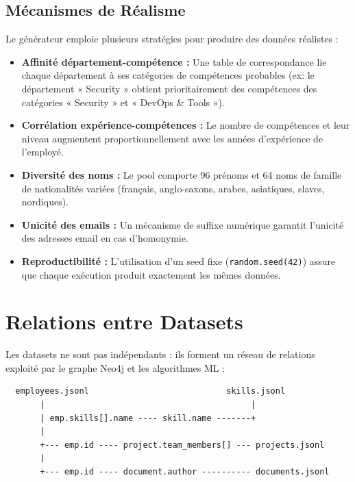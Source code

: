 \documentclass[12pt,a4paper]{article}
\begin{document}
\subsection{Mécanismes de Réalisme}

Le générateur emploie plusieurs stratégies pour produire des données réalistes :

\begin{itemize}[leftmargin=*]
    \item \textbf{Affinité département-compétence :} Une table de correspondance lie chaque département à ses catégories de compétences probables (ex: le département « Security » obtient prioritairement des compétences des catégories « Security » et « DevOps \& Tools »).
    \item \textbf{Corrélation expérience-compétences :} Le nombre de compétences et leur niveau augmentent proportionnellement avec les années d'expérience de l'employé.
    \item \textbf{Diversité des noms :} Le pool comporte 96 prénoms et 64 noms de famille de nationalités variées (français, anglo-saxons, arabes, asiatiques, slaves, nordiques).
    \item \textbf{Unicité des emails :} Un mécanisme de suffixe numérique garantit l'unicité des adresses email en cas d'homonymie.
    \item \textbf{Reproductibilité :} L'utilisation d'un seed fixe (\texttt{random.seed(42)}) assure que chaque exécution produit exactement les mêmes données.
\end{itemize}

\section{Relations entre Datasets}

Les datasets ne sont pas indépendants : ils forment un réseau de relations exploité par le graphe Neo4j et les algorithmes ML :

\begin{verbatim}
  employees.jsonl                            skills.jsonl
       |                                          |
       | emp.skills[].name ---- skill.name -------+
       |
       +--- emp.id ---- project.team_members[] --- projects.jsonl
       |
       +--- emp.id ---- document.author ---------- documents.jsonl
\end{verbatim}
\end{document}
